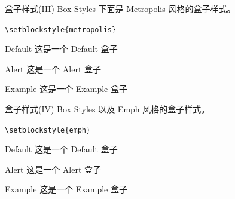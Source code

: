 \documentclass[10pt,aspectratio=169,fontset=none]{ctexbeamer}
\begin{document}
    \begin{frame}{盒子样式(III) Box Styles}
    下面是 Metropolis 风格的盒子样式。    

        \begin{center}
            \texttt{\textcolor{primary}{\textbackslash setblockstyle}\{metropolis\}}
        \end{center}

        \centering
        \begin{minipage}[b]{0.5\textwidth}
            \begin{block}{Default}
                这是一个 Default 盒子
            \end{block}
            \begin{alertblock}{Alert}
                这是一个 Alert 盒子
            \end{alertblock}
            \begin{exampleblock}{Example}
                这是一个 Example 盒子
            \end{exampleblock}       
        \end{minipage}

    \end{frame}

    \begin{frame}{盒子样式(IV) Box Styles}
    以及 Emph 风格的盒子样式。   

        \begin{center}
            \texttt{\textcolor{primary}{\textbackslash setblockstyle}\{emph\}}
        \end{center}

        \centering
        \begin{minipage}[b]{0.5\textwidth}
            \begin{block}{Default}
                这是一个 Default 盒子
            \end{block}
            \begin{alertblock}{Alert}
                这是一个 Alert 盒子
            \end{alertblock}
            \begin{exampleblock}{Example}
                这是一个 Example 盒子
            \end{exampleblock}       
        \end{minipage}
    \end{frame}
\end{document}
